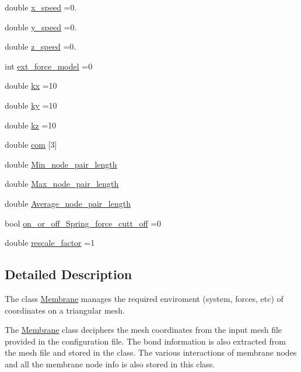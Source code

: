 \begin{DoxyCompactItemize}
$$double \mbox{\hyperlink{classMembrane_a2202f3d1bfbf7d5266a928451628f3c7}{x\+\_\+speed}} =0.
\item 
double \mbox{\hyperlink{classMembrane_a0b139d3f85f99dc1816bb83831ebdec7}{y\+\_\+speed}} =0.
\item 
double \mbox{\hyperlink{classMembrane_a3e4fb3fb47010711cc41f3f9577d6fcc}{z\+\_\+speed}} =0.
\item 
int \mbox{\hyperlink{classMembrane_a573142da932c29e270dc3df0a1b01bc5}{ext\+\_\+force\+\_\+model}} =0
\item 
double \mbox{\hyperlink{classMembrane_aa55e9c7e82f55c78653206ad26d86378}{kx}} =10
\item 
double \mbox{\hyperlink{classMembrane_a870a200fcaead7f7778d1f6d5d6f11a3}{ky}} =10
\item 
double \mbox{\hyperlink{classMembrane_a70054ec84f5834913bc47bc472171bab}{kz}} =10
\item 
double \mbox{\hyperlink{classMembrane_a9908419011350ca5fea46af3f881425c}{com}} \mbox{[}3\mbox{]}
\item 
double \mbox{\hyperlink{classMembrane_a7abb097e17e7293dc1cf559d66a01111}{Min\+\_\+node\+\_\+pair\+\_\+length}}
\item 
double \mbox{\hyperlink{classMembrane_adf55fbfa96375a631b399bd7f6cb1829}{Max\+\_\+node\+\_\+pair\+\_\+length}}
\item 
double \mbox{\hyperlink{classMembrane_ae80a22b9f52cc51918d78269af4a2061}{Average\+\_\+node\+\_\+pair\+\_\+length}}
\item 
bool \mbox{\hyperlink{classMembrane_a9bfff9bd03305c8b5cbac2e3d546727b}{on\+\_\+or\+\_\+off\+\_\+\+Spring\+\_\+force\+\_\+cutt\+\_\+off}} =0
\item 
double \mbox{\hyperlink{classMembrane_a34400db3895f0e440d6f75d52c2a1167}{rescale\+\_\+factor}} =1
\end{DoxyCompactItemize}


\subsection{Detailed Description}
The class \textquotesingle{}\mbox{\hyperlink{classMembrane}{Membrane}}\textquotesingle{} manages the required enviroment (system, forces, etc) of coordinates on a triangular mesh. 

The \mbox{\hyperlink{classMembrane}{Membrane}} class deciphers the mesh coordinates from the input mesh file provided in the configuration file. The bond information is also extracted from the mesh file and stored in the class. The various interactions of membrane nodes and all the membrane node info is also stored in this class.

